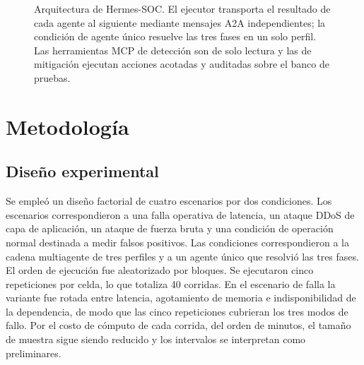 \documentclass[conference]{IEEEtran}
\begin{document}
\begin{figure}[t]
{}
\caption{Arquitectura de Hermes-SOC. El ejecutor transporta el resultado de cada
agente al siguiente mediante mensajes A2A independientes; la condición de agente
único resuelve las tres fases en un solo perfil. Las herramientas MCP de detección
son de solo lectura y las de mitigación ejecutan acciones acotadas y auditadas sobre
el banco de pruebas.}
\label{fig:arq}
\end{figure}

\section{Metodología}
\subsection{Diseño experimental}
Se empleó un diseño factorial de cuatro escenarios por dos condiciones. Los
escenarios correspondieron a una falla operativa de latencia, un ataque DDoS de capa
de aplicación, un ataque de fuerza bruta y una condición de operación normal
destinada a medir falsos positivos. Las condiciones correspondieron a la cadena
multiagente de tres perfiles y a un agente único que resolvió las tres fases. El
orden de ejecución fue aleatorizado por bloques. Se ejecutaron cinco repeticiones por
celda, lo que totaliza 40 corridas. En el escenario de falla la variante fue rotada
entre latencia, agotamiento de memoria e indisponibilidad de la dependencia, de modo
que las cinco repeticiones cubrieran los tres modos de fallo. Por el costo de cómputo
de cada corrida, del orden de minutos, el tamaño de muestra sigue siendo reducido y
los intervalos se interpretan como preliminares.
\end{document}
